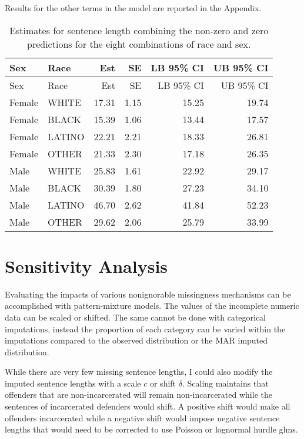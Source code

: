 \documentclass[
  letterpaper,
  DIV=11,
  numbers=noendperiod]{scrartcl}
\begin{document}
Results for the other terms in the model are reported in the Appendix.

\hypertarget{tbl-race-sex-effects}{}
\begin{longtable}[]{@{}llrrrr@{}}
\caption{\label{tbl-race-sex-effects}Estimates for sentence length
combining the non-zero and zero predictions for the eight combinations
of race and sex.}\tabularnewline
\toprule\noalign{}
Sex & Race & Est & SE & LB 95\% CI & UB 95\% CI \\
\midrule\noalign{}
\endfirsthead
\toprule\noalign{}
Sex & Race & Est & SE & LB 95\% CI & UB 95\% CI \\
\midrule\noalign{}
\endhead
\bottomrule\noalign{}
\endlastfoot
Female & WHITE & 17.31 & 1.15 & 15.25 & 19.74 \\
Female & BLACK & 15.39 & 1.06 & 13.44 & 17.57 \\
Female & LATINO & 22.21 & 2.21 & 18.33 & 26.81 \\
Female & OTHER & 21.33 & 2.30 & 17.18 & 26.35 \\
Male & WHITE & 25.83 & 1.61 & 22.92 & 29.17 \\
Male & BLACK & 30.39 & 1.80 & 27.23 & 34.10 \\
Male & LATINO & 46.70 & 2.62 & 41.84 & 52.23 \\
Male & OTHER & 29.62 & 2.06 & 25.79 & 33.99 \\
\end{longtable}

\hypertarget{sensitivity-analysis}{%
\section{Sensitivity Analysis}\label{sensitivity-analysis}}

Evaluating the impacts of various nonignorable missingness mechanisms
can be accomplished with pattern-mixture models. The values of the
incomplete numeric data can be scaled or shifted. The same cannot be
done with categorical imputations, instead the proportion of each
category can be varied within the imputations compared to the observed
distribution or the MAR imputed distribution.

While there are very few missing sentence lengths, I could also modify
the imputed sentence lengths with a scale \(c\) or shift \(\delta\).
Scaling maintains that offenders that are non-incarcerated will remain
non-incarcerated while the sentences of incarcerated defenders would
shift. A positive shift would make all offenders incarcerated while a
negative shift would impose negative sentence lengths that would need to
be corrected to use Poisson or lognormal hurdle glms.
\end{document}
